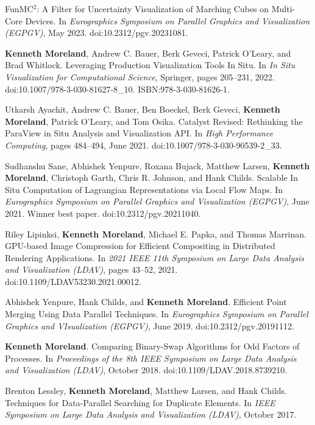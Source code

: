 \begin{enumerate}[label={[\arabic*]}, left=0pt]
  {FunMC$^2$}: A Filter for Uncertainty Visualization of Marching Cubes on Multi-Core Devices.
  In \emph{Eurographics Symposium on Parallel Graphics and Visualization (EGPGV)}, May 2023.
  doi:10.2312/pgv.20231081.
\item  %
  \textbf{Kenneth Moreland}, Andrew C. Bauer, Berk Geveci, Patrick O'Leary, and Brad Whitlock.
  Leveraging Production Visualization Tools In Situ.
  In \emph{In Situ Visualization for Computational Science}, Springer, pages 205--231, 2022.
  doi:10.1007/978-3-030-81627-8\_10.
  ISBN:978-3-030-81626-1.
\item  %
  Utkarsh Ayachit, Andrew C. Bauer, Ben Boeckel, Berk Geveci, \textbf{Kenneth Moreland}, Patrick O'Leary, and Tom Osika.
  Catalyst Revised: Rethinking the ParaView in Situ Analysis and Visualization {API}.
  In \emph{High Performance Computing}, pages 484--494, June 2021.
  doi:10.1007/978-3-030-90539-2\_33.
\item  %
  Sudhanshu Sane, Abhishek Yenpure, Roxana Bujack, Matthew Larsen, \textbf{Kenneth Moreland}, Christoph Garth, Chris R. Johnson, and Hank Childs.
  Scalable In Situ Computation of {Lagrangian} Representations via Local Flow Maps.
  In \emph{Eurographics Symposium on Parallel Graphics and Visualization (EGPGV)}, June 2021.
Winner best paper.  doi:10.2312/pgv.20211040.
\item  %
  Riley Lipinksi, \textbf{Kenneth Moreland}, Michael E. Papka, and Thomas Marrinan.
  {GPU}-based Image Compression for Efficient Compositing in Distributed Rendering Applications.
  In \emph{2021 IEEE 11th Symposium on Large Data Analysis and Visualization (LDAV)}, pages 43--52, 2021.
  doi:10.1109/LDAV53230.2021.00012.
\item  %
  Abhishek Yenpure, Hank Childs, and \textbf{Kenneth Moreland}.
  Efficient Point Merging Using Data Parallel Techniques.
  In \emph{Eurographics Symposium on Parallel Graphics and VIsualization (EGPGV)}, June 2019.
  doi:10.2312/pgv.20191112.
\item  %
  \textbf{Kenneth Moreland}.
  Comparing Binary-Swap Algorithms for Odd Factors of Processes.
  In \emph{Proceedings of the 8th IEEE Symposium on Large Data Analysis and Visualization (LDAV)}, October 2018.
  doi:10.1109/LDAV.2018.8739210.
\item  %
  Brenton Lessley, \textbf{Kenneth Moreland}, Matthew Larsen, and Hank Childs.
  Techniques for Data-Parallel Searching for Duplicate Elements.
  In \emph{IEEE Symposium on Large Data Analysis and Visualization (LDAV)}, October 2017.

\end{enumerate}
